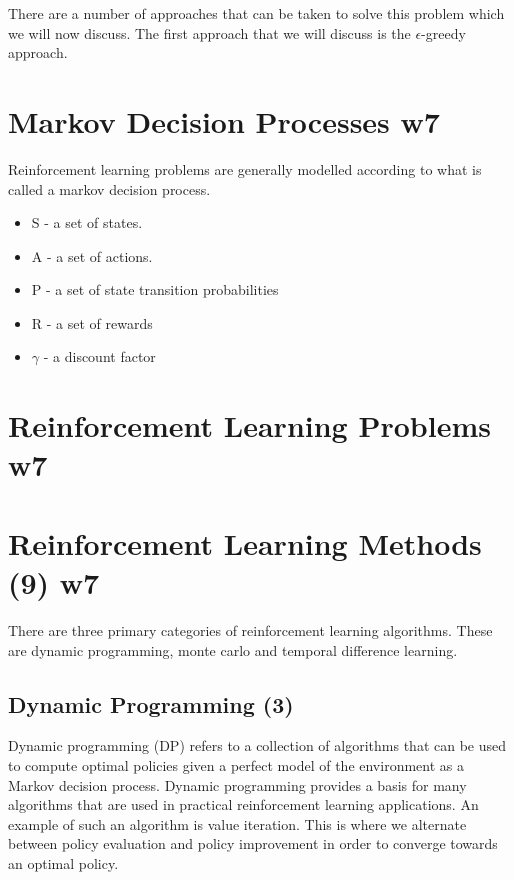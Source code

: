 There are a number of approaches that can be taken to solve this problem which we will now discuss.
The first approach that we will discuss is the $\epsilon$-greedy approach.


\section{Markov Decision Processes w7}\label{sec:mdp}
Reinforcement learning problems are generally modelled according to what is called a markov decision process.

\begin{itemize}
    \item S - a set of states.
    \item A - a set of actions.
    \item P - a set of state transition probabilities
    \item R - a set of rewards
    \item $\gamma$ - a discount factor
\end{itemize}

\section{Reinforcement Learning Problems w7}\label{sec:rlProblems}

\section{Reinforcement Learning Methods (9) w7}\label{sec:rlMethods}
There are three primary categories of reinforcement learning algorithms.
These are dynamic programming, monte carlo and temporal difference learning.

\subsection{Dynamic Programming (3)}\label{subsec:dp}
Dynamic programming (DP) refers to a collection of algorithms that can be used to compute optimal policies given a
perfect model of the environment as a Markov decision process\cite{sutton1998reinforcement}.
Dynamic programming provides a basis for many algorithms that are used in practical reinforcement learning applications.
An example of such an algorithm is value iteration.
This is where we alternate between policy evaluation and policy improvement in order to converge towards an optimal
policy.

